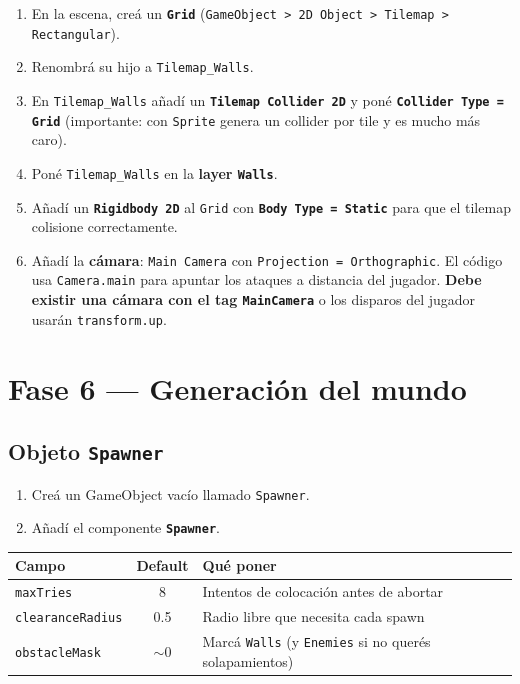 \documentclass[a4paper,12pt]{article}
\newcommand{\code}[1]{\texttt{#1}}
\begin{document}
\begin{enumerate}
    \item En la escena, creá un \textbf{\code{Grid}} (\code{GameObject > 2D Object > Tilemap > Rectangular}).
    \item Renombrá su hijo a \code{Tilemap\_Walls}.
    \item En \code{Tilemap\_Walls} añadí un \textbf{\code{Tilemap Collider 2D}} y poné
    \textbf{\code{Collider Type = Grid}} (importante: con \code{Sprite} genera un collider por
    tile y es mucho más caro).
    \item Poné \code{Tilemap\_Walls} en la \textbf{layer \code{Walls}}.
    \item Añadí un \textbf{\code{Rigidbody 2D}} al \code{Grid} con \textbf{\code{Body Type = Static}}
    para que el tilemap colisione correctamente.
    \item Añadí la \textbf{cámara}: \code{Main Camera} con \code{Projection = Orthographic}. El
    código usa \code{Camera.main} para apuntar los ataques a distancia del jugador.
    \textbf{Debe existir una cámara con el tag \code{MainCamera}} o los disparos del jugador
    usarán \code{transform.up}.
\end{enumerate}

\section{Fase 6 --- Generación del mundo}

\subsection{Objeto \code{Spawner}}

\begin{enumerate}
    \item Creá un GameObject vacío llamado \code{Spawner}.
    \item Añadí el componente \textbf{\code{Spawner}}.
\end{enumerate}

\begin{center}
\begin{tabular}{|l|c|p{6.8cm}|}
\hline
\textbf{Campo} & \textbf{Default} & \textbf{Qué poner} \\
\hline
\code{maxTries} & 8 & Intentos de colocación antes de abortar \\
\hline
\code{clearanceRadius} & 0.5 & Radio libre que necesita cada spawn \\
\hline
\code{obstacleMask} & $\sim$0 & Marcá \code{Walls} (y \code{Enemies} si no querés solapamientos) \\
\hline
\end{tabular}
\end{center}
\end{document}
